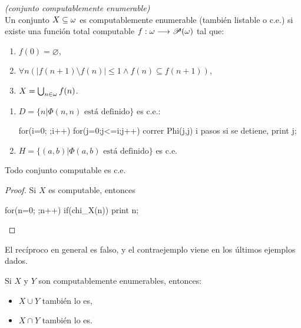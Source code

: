 \begin{defn} \textit{(conjunto computablemente enumerable)}\\
    Un conjunto $X\subseteq\omega$ es computablemente enumerable (también listable o c.e.) si existe una función total computable $f:\omega\longrightarrow\mathscr{P}(\omega)$ tal que:
    \begin{enumerate}
        \item $f(0)=\varnothing$,
        \item $\forall n(|f(n+1)\setminus f(n)|\leq 1\land f(n)\subseteq f(n+1))$,
        \item $X=\bigcup_{n\in\omega}f(n)$.
    \end{enumerate}
\end{defn}
\begin{ex}
    \hspace{1cm}
    \begin{enumerate}
        \item $D=\{n|\Phi(n,n)\text{ está definido}\}$ es c.e.:
            \begin{center}
            \begin{pseudocodigo}
                for(i=0; ;i++)
                    for(j=0;j<=i;j++)
                        correr Phi(j,j) i pasos
                        si se detiene, print j;
            \end{pseudocodigo}
            \end{center}
        \item $H=\{(a,b)|\Phi(a,b)\text{ está definido}\}$ es c.e.
    \end{enumerate}
\end{ex}
\begin{prop}
    Todo conjunto computable es c.e.
\end{prop}
\begin{proof}
    Si $X$ es computable, entonces
        \begin{center}
        \begin{pseudocodigo}
            for(n=0; ;n++)
                if(chi_X(n))
                    print n;
        \end{pseudocodigo}
        \end{center}
\end{proof}
\begin{obs}
    El recíproco en general es falso, y el contraejemplo viene en los últimos ejemplos dados.
\end{obs}
\begin{prop}
    Si $X$ y $Y$ son computablemente enumerables, entonces:
    \begin{itemize}
        \item $X\cup Y$ también lo es,
        \item $X\cap Y$ también lo es.
    \end{itemize}
\end{prop}
